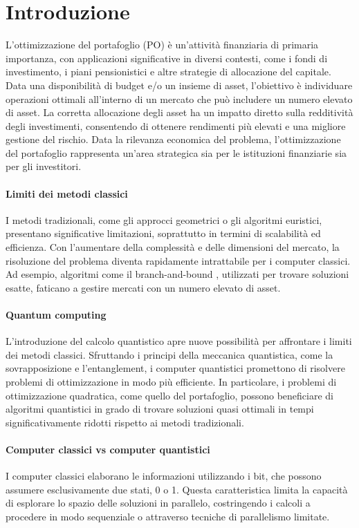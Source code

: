 \section{Introduzione}\label{sec:introduction}
L'ottimizzazione del portafoglio (PO) è un'attività finanziaria di primaria 
importanza, con applicazioni significative in diversi contesti, come 
i fondi di investimento, i piani pensionistici e altre strategie di 
allocazione del capitale. Data una disponibilità di budget e/o un 
insieme di asset, l'obiettivo è individuare operazioni ottimali 
all'interno di un mercato che può includere un numero elevato di asset.
La corretta allocazione degli asset ha un impatto diretto sulla 
redditività degli investimenti, consentendo di ottenere rendimenti più 
elevati e una migliore gestione del rischio. Data la rilevanza economica 
del problema, l’ottimizzazione del portafoglio rappresenta un’area 
strategica sia per le istituzioni finanziarie sia per gli investitori.

\paragraph{Limiti dei metodi classici}
I metodi tradizionali, come gli approcci geometrici o gli algoritmi 
euristici, presentano significative limitazioni, soprattutto in termini 
di scalabilità ed efficienza. Con l’aumentare della complessità e delle 
dimensioni del mercato, la risoluzione del problema diventa rapidamente 
intrattabile per i computer classici. Ad esempio, algoritmi come il 
branch-and-bound \cite{land2010automatic}, utilizzati per trovare soluzioni 
esatte, faticano a gestire mercati con un numero elevato di asset. 

\paragraph{Quantum computing}
L’introduzione del calcolo quantistico apre nuove possibilità per 
affrontare i limiti dei metodi classici. Sfruttando i principi della 
meccanica quantistica, come la sovrapposizione e l’entanglement, i 
computer quantistici promettono di risolvere problemi di ottimizzazione 
in modo più efficiente. In particolare, i problemi di ottimizzazione 
quadratica, come quello del portafoglio, possono beneficiare di 
algoritmi quantistici in grado di trovare soluzioni quasi ottimali in 
tempi significativamente ridotti rispetto ai metodi tradizionali.

\paragraph{Computer classici vs computer quantistici}
I computer classici elaborano le informazioni utilizzando i bit, che 
possono assumere esclusivamente due stati, 0 o 1. Questa caratteristica 
limita la capacità di esplorare lo spazio delle soluzioni in parallelo, 
costringendo i calcoli a procedere in modo sequenziale o attraverso 
tecniche di parallelismo limitate.

